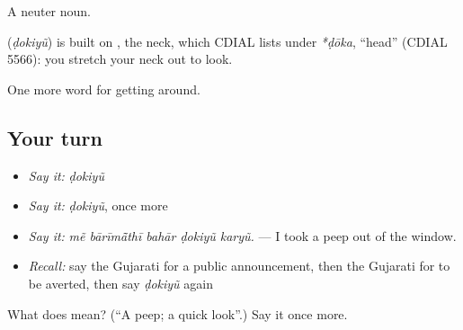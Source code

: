 A neuter noun.

\begin{cousinweb}
\textbf{} (\emph{ḍokiyũ}) is built on , the neck, which CDIAL lists under \emph{*ḍōka}, \textquotedblleft{}head\textquotedblright{} (CDIAL 5566): you stretch your neck out to look.
\end{cousinweb}

\begin{grammarlens}[title={What you've built}]
One more word for getting around.
\end{grammarlens}

\subsection*{Your turn}
\begin{itemize}
\raggedright
  \item \emph{Say it:} \emph{ḍokiyũ}
  \item \emph{Say it:} \emph{ḍokiyũ}, once more
  \item \emph{Say it:} \emph{mẽ bārīmā̃thī bahār ḍokiyũ karyũ.} — I took a peep out of the window.
  \item \emph{Recall:} say the Gujarati for a public announcement, then the Gujarati for to be averted, then say \emph{ḍokiyũ} again
\end{itemize}

\begin{tcolorbox}[breakable,colback=teal!4,colframe=teal!35!black,title={Before you move on}]
What does  mean? (\textquotedblleft{}A peep; a quick look\textquotedblright{}.) Say it once more.
\end{tcolorbox}
